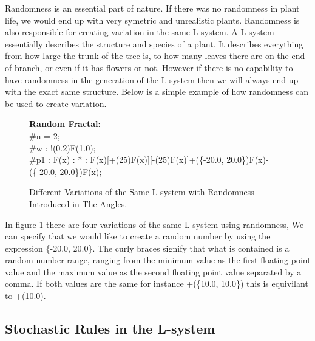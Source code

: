 \begin{flushleft}

Randomness is an essential part of nature. If there was no randomness in plant life, we would end up with very symetric and unrealistic plants. Randomness is also responsible for creating variation in the same L-system. A L-system essentially describes the structure and species of a plant. It describes everything from how large the trunk of the tree is, to how many leaves there are on the end of branch, or even if it has flowers or not. However if there is no capability to have randomness in the generation of the L-system then we will always end up with the exact same structure. 
\vspace{5mm}
Below is a simple example of how randomness can be used to create variation.

\end{flushleft}   

\begin{figure}[htbp]
	\raggedright
	\textbf{\underline{Random Fractal:}} \\
	\#n = 2; \\
	\#w : !(0.2)F(1.0); \\
	\#p1 : F(x) : * : F(x)[+(25)F(x)][-(25)F(x)]+(\{-20.0, 20.0\})F(x)-(\{-20.0, 20.0\})F(x);\\
	\vspace{10mm}
	{\centering
		\vspace{7px}
		\setlength{\fboxrule}{1pt}
		\caption{Different Variations of the Same L-system with Randomness Introduced in The Angles. \label{figRandomness}}
	}
\end{figure}
\FloatBarrier

\begin{flushleft}

In figure \ref{figRandomness} there are four variations of the same L-system using randomness, We can specify that we would like to create a random number by using the expression \{-20.0, 20.0\}. The curly braces signify that what is contained is a random number range, ranging from the minimum value as the first floating point value and the maximum value as the second floating point value separated by a comma. If both values are the same for instance +(\{10.0, 10.0\}) this is equivilant to +(10.0).

\end{flushleft}

\subsection{Stochastic Rules in the L-system} \label{Stochastic L-system Subsection}

